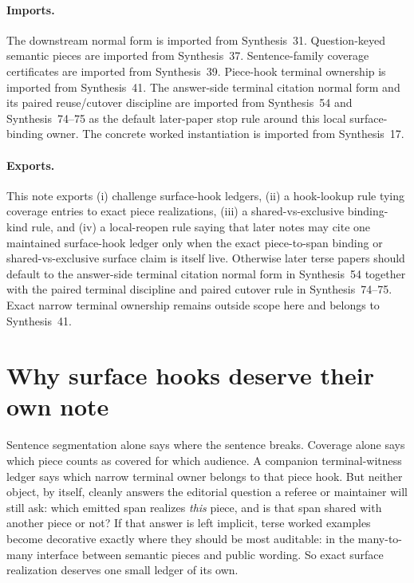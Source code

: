 \documentclass[11pt]{article}
\begin{document}
\paragraph{Imports.}
The downstream normal form is imported from Synthesis~31.\cite{series:downstreamnormalforms}
Question-keyed semantic pieces are imported from Synthesis~37.\cite{series:challengestops}
Sentence-family coverage certificates are imported from Synthesis~39.\cite{series:challengecoverage}
Piece-hook terminal ownership is imported from Synthesis~41.\cite{series:challengeterminalwitnesses}
The answer-side terminal citation normal form and its paired reuse/cutover discipline are imported from Synthesis~54 and Synthesis~74--75 as the default later-paper stop rule around this local surface-binding owner.\cite{series:challengeanswerreviewmenus,series:pairedterminalcitationdiscipline,series:pairedterminalcutoverrules}
The concrete worked instantiation is imported from Synthesis~17.\cite{series:workedexample}
\paragraph{Exports.}
This note exports (i) challenge surface-hook ledgers, (ii) a hook-lookup rule tying coverage entries to exact piece realizations, (iii) a shared-vs-exclusive binding-kind rule, and (iv) a local-reopen rule saying that later notes may cite one maintained surface-hook ledger only when the exact piece-to-span binding or shared-vs-exclusive surface claim is itself live.
Otherwise later terse papers should default to the answer-side terminal citation normal form in Synthesis~54 together with the paired terminal discipline and paired cutover rule in Synthesis~74--75. Exact narrow terminal ownership remains outside scope here and belongs to Synthesis~41.\cite{series:challengeterminalwitnesses,series:challengeanswerreviewmenus,series:pairedterminalcitationdiscipline,series:pairedterminalcutoverrules}
\section{Why surface hooks deserve their own note}
Sentence segmentation alone says where the sentence breaks.
Coverage alone says which piece counts as covered for which audience.
A companion terminal-witness ledger says which narrow terminal owner belongs to that piece hook.
But neither object, by itself, cleanly answers the editorial question a referee or maintainer will still ask: which emitted span realizes \emph{this} piece, and is that span shared with another piece or not?
If that answer is left implicit, terse worked examples become decorative exactly where they should be most auditable: in the many-to-many interface between semantic pieces and public wording.
So exact surface realization deserves one small ledger of its own.
\end{document}
